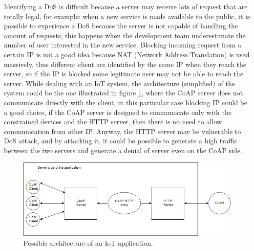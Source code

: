 	Identifying a DoS is difficult because a server may receive lots of request that are totally legal, for example: when a new service is made available to the public, it is possible to experience a DoS because the server is not capable of handling the amount of requests, this happens when the development team underestimate the number of user interested in the new service.\newline
	Blocking incoming request from a certain IP is not a good idea because NAT (Network Address Translation) is used massively, thus different client are identified by the same IP when they reach the server, so if the IP is blocked some legitimate user may not be able to reach the server.\newline
	While dealing with an IoT system, the architecture (simplified) of the system could be the one illustrated in figure \ref{fig:coap-vuln2}, where the CoAP server does not communicate directly with the client, in this particular case blocking IP could be a good choice, if the CoAP server is designed to communicate only with the constrained devices and the HTTP server, then there is no need to allow communication from other IP.\newline
	Anyway, the HTTP server may be vulnerable to DoS attack, and by attacking it, it could be possible to generate a high traffic between the two servers and generate a denial of server even on the CoAP side.\newline
	
	\begin{figure}
		\includegraphics[width=\linewidth]{coap-vuln-img2.png}
		\caption{Possible architecture of an IoT application.}
		\label{fig:coap-vuln2}
	\end{figure}
	

